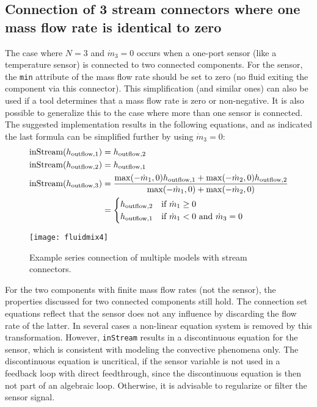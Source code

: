 \subsection{Connection of 3 stream connectors where one mass flow rate is identical to zero}\label{connection-of-3-stream-connectors-where-one-mass-flow-rate-is-identical-to-zero-n-3-and}
The case where $N=3$ and $\dot{m}_3=0$ occurs when a one-port sensor (like a temperature sensor) is
connected to two connected components. For the sensor, the \lstinline!min! attribute
of the mass flow rate should be set to zero (no fluid exiting the
component via this connector).
This simplification (and similar ones) can also be used if a tool determines that a mass flow rate is zero or non-negative.
It is also possible to generalize this to the case where more than one sensor is connected.
The suggested implementation results in
the following equations, and as indicated the last formula can be
simplified further by using $\dot{m}_3=0$:
\begin{align*}
\text{\lstinline!inStream!}(h_{\mathrm{outflow},1}) &= h_{\mathrm{outflow},2}\\
\text{\lstinline!inStream!}(h_{\mathrm{outflow},2}) &= h_{\mathrm{outflow},1}\\
\text{\lstinline!inStream!}(h_{\mathrm{outflow},3}) &= \frac{\operatorname{max}(-\dot{m}_1,0)h_{\mathrm{outflow},1}+\operatorname{max}(-\dot{m}_2,0)h_{\mathrm{outflow},2}}{\operatorname{max}(-\dot{m}_1,0)+\operatorname{max}(-\dot{m}_2,0)}\\
&=
\begin{cases}
h_{\mathrm{outflow},2}&\text{if $\dot{m}_1 \geq 0$}\\
h_{\mathrm{outflow},1}&\text{if $\dot{m}_1 < 0$ and $\dot{m}_3 = 0$}
\end{cases}
\end{align*}
\begin{figure}[H]
  \begin{center}
    \texttt{[image: fluidmix4]}
  \end{center}
  \caption{Example series connection of multiple models with stream connectors.}
\end{figure}

For the two components with finite mass flow rates (not the sensor), the
properties discussed for two connected components still hold. The
connection set equations reflect that the sensor does not any influence
by discarding the flow rate of the latter. In several cases a non-linear
equation system is removed by this transformation. However, \lstinline!inStream!
results in a discontinuous equation for the sensor, which is consistent
with modeling the convective phenomena only. The discontinuous equation
is uncritical, if the sensor variable is not used in a feedback loop
with direct feedthrough, since the discontinuous equation is then not
part of an algebraic loop. Otherwise, it is advisable to regularize or
filter the sensor signal.

